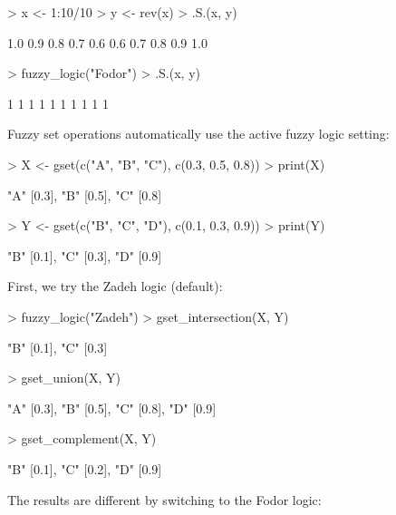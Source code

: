 \documentclass[article]{jss}
\begin{document}
\begin{Schunk}
\begin{Sinput}
> x <- 1:10/10
> y <- rev(x)
> .S.(x, y)
\end{Sinput}
\begin{Soutput}
 [1] 1.0 0.9 0.8 0.7 0.6 0.6 0.7 0.8 0.9 1.0
\end{Soutput}
\begin{Sinput}
> fuzzy_logic("Fodor")
> .S.(x, y)
\end{Sinput}
\begin{Soutput}
 [1] 1 1 1 1 1 1 1 1 1 1
\end{Soutput}
\end{Schunk}
Fuzzy set operations automatically use the active fuzzy logic setting:
\begin{Schunk}
\begin{Sinput}
> X <- gset(c("A", "B", "C"), c(0.3, 0.5, 0.8))
> print(X)
\end{Sinput}
\begin{Soutput}
{"A" [0.3], "B" [0.5], "C" [0.8]}
\end{Soutput}
\begin{Sinput}
> Y <- gset(c("B", "C", "D"), c(0.1, 0.3, 0.9))
> print(Y)
\end{Sinput}
\begin{Soutput}
{"B" [0.1], "C" [0.3], "D" [0.9]}
\end{Soutput}
\end{Schunk}
First, we try the Zadeh logic (default):
\begin{Schunk}
\begin{Sinput}
> fuzzy_logic("Zadeh")
> gset_intersection(X, Y)
\end{Sinput}
\begin{Soutput}
{"B" [0.1], "C" [0.3]}
\end{Soutput}
\begin{Sinput}
> gset_union(X, Y)
\end{Sinput}
\begin{Soutput}
{"A" [0.3], "B" [0.5], "C" [0.8], "D" [0.9]}
\end{Soutput}
\begin{Sinput}
> gset_complement(X, Y)
\end{Sinput}
\begin{Soutput}
{"B" [0.1], "C" [0.2], "D" [0.9]}
\end{Soutput}
\end{Schunk}
The results are different by switching to the Fodor logic:
\end{document}
